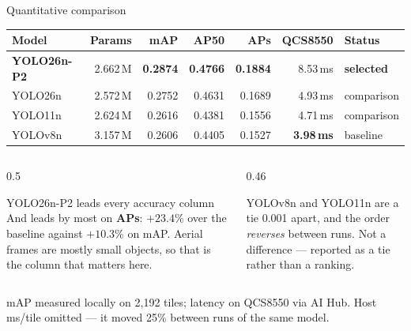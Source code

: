 \begin{frame}{Quantitative comparison}
  \begin{center}
    \small
    \begin{tabular}{@{}lrrrrrl@{}}
      \toprule
      \textbf{Model} & \textbf{Params} & \textbf{mAP} & \textbf{AP50} &
      \textbf{APs} & \textbf{QCS8550} & \textbf{Status} \\
      \midrule
      \textbf{YOLO26n-P2} & 2.662\,M & \textbf{0.2874} & \textbf{0.4766} &
        \textbf{0.1884} & 8.53\,ms & \textbf{selected} \\
      YOLO26n  & 2.572\,M & 0.2752 & 0.4631 & 0.1689 & 4.93\,ms & comparison \\
      YOLO11n  & 2.624\,M & 0.2616 & 0.4381 & 0.1556 & 4.71\,ms & comparison \\
      YOLOv8n  & 3.157\,M & 0.2606 & 0.4405 & 0.1527 & \textbf{3.98\,ms} & baseline \\
      \bottomrule
    \end{tabular}
  \end{center}
  \vfill
  \begin{columns}[T,onlytextwidth]
    \begin{column}{0.5\textwidth}
      \begin{exampleblock}{YOLO26n-P2 leads every accuracy column}
        \small
        And leads by most on \textbf{APs}: $+23.4$\% over the baseline against
        $+10.3$\% on mAP. Aerial frames are mostly small objects, so that is
        the column that matters here.
      \end{exampleblock}
    \end{column}
    \begin{column}{0.46\textwidth}
      \begin{alertblock}{YOLOv8n and YOLO11n are a tie}
        \small
        0.001 apart, and the order \emph{reverses} between runs. Not a
        difference --- reported as a tie rather than a ranking.
      \end{alertblock}
    \end{column}
  \end{columns}
  \vspace{2pt}
  \tiny\color{gray}
  mAP measured locally on 2{,}192 tiles; latency on QCS8550 via AI Hub.
  Host ms/tile omitted --- it moved 25\% between runs of the same model.
\end{frame}

